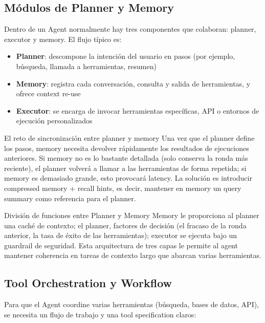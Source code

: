 \documentclass[a4paper]{article}
\begin{document}
\subsection{Módulos de Planner y Memory}

Dentro de un Agent normalmente hay tres componentes que colaboran: planner, executor y memory. El flujo típico es:

\begin{itemize}
    \item \textbf{Planner}: descompone la intención del usuario en pasos (por ejemplo, búsqueda, llamada a herramientas, resumen)
    \item \textbf{Memory}: registra cada conversación, consulta y salida de herramientas, y ofrece context re-use
    \item \textbf{Executor}: se encarga de invocar herramientas específicas, API o entornos de ejecución personalizados
\end{itemize}

\begin{importantbox}{El reto de sincronización entre planner y memory}
Una vez que el planner define los pasos, memory necesita devolver rápidamente los resultados de ejecuciones anteriores. Si memory no es lo bastante detallada (solo conserva la ronda más reciente), el planner volverá a llamar a las herramientas de forma repetida; si memory es demasiado grande, esto provocará latency. La solución es introducir compressed memory + recall hints, es decir, mantener en memory un query summary como referencia para el planner.
\end{importantbox}
\begin{importantbox}{División de funciones entre Planner y Memory}
Memory le proporciona al planner una caché de contexto; el planner, factores de decisión (el fracaso de la ronda anterior, la tasa de éxito de las herramientas); executor se ejecuta bajo un guardrail de seguridad. Esta arquitectura de tres capas le permite al agent mantener coherencia en tareas de contexto largo que abarcan varias herramientas.
\end{importantbox}

\subsection{Tool Orchestration y Workflow}

Para que el Agent coordine varias herramientas (búsqueda, bases de datos, API), se necesita un flujo de trabajo y una tool specification claros:
\end{document}

